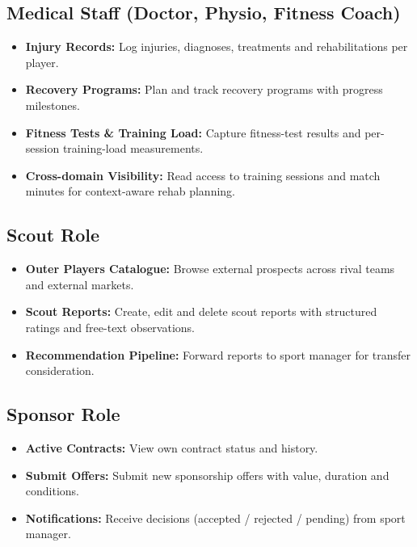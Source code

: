 \documentclass[12pt,a4paper,oneside]{report}
\begin{document}
\subsection*{Medical Staff (Doctor, Physio, Fitness Coach)}
\begin{itemize}[leftmargin=*]
  \item \textbf{Injury Records:} Log injuries, diagnoses, treatments
        and rehabilitations per player.
  \item \textbf{Recovery Programs:} Plan and track recovery programs
        with progress milestones.
  \item \textbf{Fitness Tests \& Training Load:} Capture fitness-test
        results and per-session training-load measurements.
  \item \textbf{Cross-domain Visibility:} Read access to training
        sessions and match minutes for context-aware rehab planning.
\end{itemize}

\subsection*{Scout Role}
\begin{itemize}[leftmargin=*]
  \item \textbf{Outer Players Catalogue:} Browse external prospects
        across rival teams and external markets.
  \item \textbf{Scout Reports:} Create, edit and delete scout reports
        with structured ratings and free-text observations.
  \item \textbf{Recommendation Pipeline:} Forward reports to sport
        manager for transfer consideration.
\end{itemize}

\subsection*{Sponsor Role}
\begin{itemize}[leftmargin=*]
  \item \textbf{Active Contracts:} View own contract status and
        history.
  \item \textbf{Submit Offers:} Submit new sponsorship offers with
        value, duration and conditions.
  \item \textbf{Notifications:} Receive decisions (accepted /
        rejected / pending) from sport manager.
\end{itemize}
\end{document}

